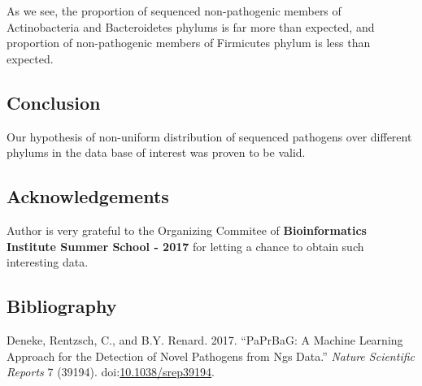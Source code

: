 \documentclass[]{article}
\begin{document}
As we see, the proportion of sequenced non-pathogenic members of
Actinobacteria and Bacteroidetes phylums is far more than expected, and
proportion of non-pathogenic members of Firmicutes phylum is less than
expected.

\subsection{Conclusion}\label{conclusion}

Our hypothesis of non-uniform distribution of sequenced pathogens over
different phylums in the data base of interest was proven to be valid.

\subsection{Acknowledgements}\label{acknowledgements}

Author is very grateful to the Organizing Commitee of
\textbf{Bioinformatics Institute Summer School - 2017} for letting a
chance to obtain such interesting data.

\subsection*{Bibliography}\label{bibliography}

\hypertarget{refs}{}
\hypertarget{ref-PaPrBaG}{}
Deneke, Rentzsch, C., and B.Y. Renard. 2017. ``PaPrBaG: A Machine
Learning Approach for the Detection of Novel Pathogens from Ngs Data.''
\emph{Nature Scientific Reports} 7 (39194).
doi:\href{https://doi.org/10.1038/srep39194}{10.1038/srep39194}.
\end{document}
